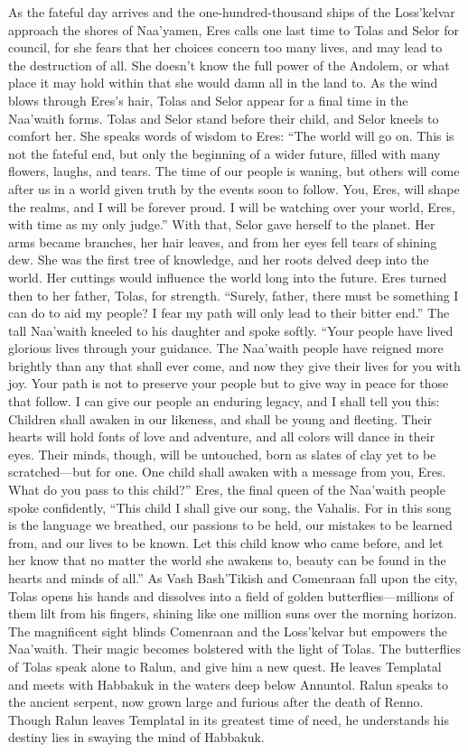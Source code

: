 \documentclass[smalldemyvopaper,11pt,twoside,onecolumn,openright,extrafontsizes]{memoir}
\begin{document}
{{As the fateful day arrives and the one-hundred-thousand ships of the Loss’kelvar approach the shores of Naa’yamen, Eres calls one last time to Tolas and Selor for council, for she fears that her choices concern too many lives, and may lead to the destruction of all. She doesn’t know the full power of the Andolem, or what place it may hold within that she would damn all in the land to. As the wind blows through Eres’s hair, Tolas and Selor appear for a final time in the Naa’waith forms.  Tolas and Selor stand before their child, and Selor kneels to comfort her. She speaks words of wisdom to Eres: “The world will go on. This is not the fateful end, but only the beginning of a wider future, filled with many flowers, laughs, and tears. The time of our people is waning, but others will come after us in a world given truth by the events soon to follow. You, Eres, will shape the realms, and I will be forever proud. I will be watching over your world, Eres, with time as my only judge.” With that, Selor gave herself to the planet. Her arms became branches, her hair leaves, and from her eyes fell tears of shining dew. She was the first tree of knowledge, and her roots delved deep into the world. Her cuttings would influence the world long into the future. Eres turned then to her father, Tolas, for strength. “Surely, father, there must be something I can do to aid my people? I fear my path will only lead to their bitter end.” The tall Naa’waith kneeled to his daughter and spoke softly. “Your people have lived glorious lives through your guidance. The Naa’waith people have reigned more brightly than any that shall ever come, and now they give their lives for you with joy. Your path is not to preserve your people but to give way in peace for those that follow. I can give our people an enduring legacy, and I shall tell you this: Children shall awaken in our likeness, and shall be young and fleeting. Their hearts will hold fonts of love and adventure, and all colors will dance in their eyes. Their minds, though, will be untouched, born as slates of clay yet to be scratched—but for one. One child shall awaken with a message from you, Eres. What do you pass to this child?” Eres, the final queen of the Naa’waith people spoke confidently, “This child I shall give our song, the Vahalis. For in this song is the language we breathed, our passions to be held, our mistakes to be learned from, and our lives to be known. Let this child know who came before, and let her know that no matter the world she awakens to, beauty can be found in the hearts and minds of all.”
As Vash Bash’Tikish and Comenraan fall upon the city, Tolas opens his hands and dissolves into a field of golden butterflies—millions of them lilt from his fingers, shining like one million suns over the morning horizon. The magnificent sight blinds Comenraan and the Loss’kelvar but empowers the Naa’waith. Their magic becomes bolstered with the light of Tolas. The butterflies of Tolas speak alone to Ralun, and give him a new quest. He leaves Templatal and meets with Habbakuk in the waters deep below Annuntol. Ralun speaks to the ancient serpent, now grown large and furious after the death of Renno. Though Ralun leaves Templatal in its greatest time of need, he understands his destiny lies in swaying the mind of Habbakuk.

}}
\end{document}
